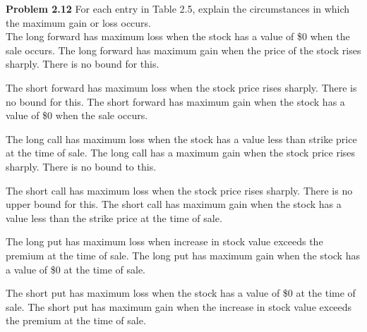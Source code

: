 \documentclass[12pt]{article}
\newcommand{\problem}[1]{\bigskip \noindent \textbf{Problem #1}}
\theoremstyle{plain}
\begin{document}
\problem{2.12} For each entry in Table 2.5, explain the circumstances in which the maximum gain or loss occurs.\\

The long forward has maximum loss when the stock has a value of \$0 when the sale occurs. The long forward has maximum gain when the price of the stock rises sharply. There is no bound for this.

The short forward has maximum loss when the stock price rises sharply. There is no bound for this. The short forward has maximum gain when the stock has a value of \$0 when the sale occurs.

The long call has maximum loss when the stock has a value less than strike price at the time of sale. The long call has a maximum gain when the stock price rises sharply. There is no bound to this.

The short call has maximum loss when the stock price rises sharply. There is no upper bound for this. The short call has maximum gain when the stock has a value less than the strike price at the time of sale.

The long put has maximum loss when increase in stock value exceeds the premium at the time of sale. The long put has maximum gain when the stock has a value of \$0 at the time of sale.

The short put has maximum loss when the stock has a value of \$0 at the time of sale. The short put has maximum gain when the increase in stock value exceeds the premium at the time of sale.
\end{document}
